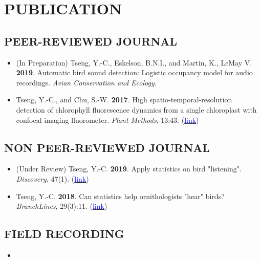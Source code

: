 \documentclass[11pt,letterpaper,sans]{moderncv}        %
\begin{document}
{%
\section{PUBLICATION}
\subsection{PEER-REVIEWED JOURNAL}
\begin{itemize}
\item{(In Preparation) Tseng, Y.-C., Eskelson, B.N.I., and Martin, K., LeMay V. \textbf{2019}. Automatic bird sound detection: Logistic occupancy model for audio recordings. \textit{Avian Conservation and Ecology}.}
\vspace{3pt}

\item{Tseng, Y.-C., and Chu, S.-W. \textbf{2017}. High spatio-temporal-resolution detection of chlorophyll fluorescence dynamics from a single chloroplast with confocal imaging fluorometer. \textit{Plant Methods}, 13:43. (\href{https://doi.org/10.1186/s13007-017-0194-2}{\textcolor{blue}{link}})}
\end{itemize}

\subsection{NON PEER-REVIEWED JOURNAL}
\begin{itemize}
\item{(Under Review) Tseng, Y.-C. \textbf{2019}. Apply statistics on bird "listening". \textit{Discovery}}, 47(1). (\href{https://naturevancouver.ca/publications/discovery/}{\textcolor{blue}{link}})
\vspace{3pt}

\item{Tseng, Y.-C. \textbf{2018}. Can statistics help ornithologists "hear" birds? \textit{BranchLines}}, 29(3):11. (\href{https://forestry.ubc.ca/files/2019/04/bl-29.3.pdf}{\textcolor{blue}{link}}) 

\end{itemize}



\subsection{FIELD RECORDING}
\begin{itemize}
\item{}
\end{itemize}


}
\end{document}
